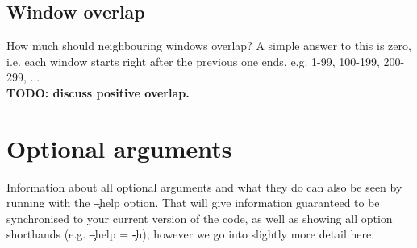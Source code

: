 \subsection{Window overlap}
How much should neighbouring windows overlap?
A simple answer to this is zero, i.e. each window starts right after the previous one ends.
e.g. 1-99, 100-199, 200-299, $\ldots$\\
{\bf TODO: discuss positive overlap.}

\section{Optional arguments}

Information about all optional arguments and what they do can also be seen by running \p with the \c{--help} option.
That will give information guaranteed to be synchronised to your current version of the code, as well as showing all option shorthands (e.g. \c{--help} = \c{-h}); however we go into slightly more detail here.

